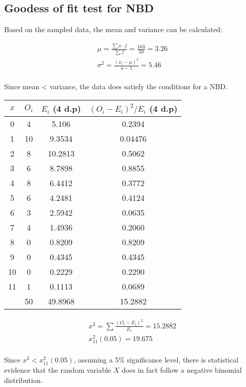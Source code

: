 \documentclass{article}
\begin{document}
\subsection{Goodess of fit test for NBD}

Based on the sampled data, the mean and variance can be calculated:

\begin{gather*}
  \mu = \frac{\sum x \cdot f}{\sum f} = \frac{163}{50} = 3.26 \\[5pt]
  \sigma^2 = \frac{(x_i - \mu)^2}{n - 1} = 5.46 \\[5pt]
\end{gather*}

Since mean < variance, the data does satisfy the conditions for
a NBD.

\begin{center}
  \begin{tabular}{|c|c|c|c|}
    \hline
    $x$ & $O_i$ & $ E_i $ (4 d.p) & $ (O_i - E_i)^2 / E_i $ (4 d.p) \\
    \hline 
    \hline 
    0  & 4  & 5.106   & 0.2394 \\
    1  & 10 & 9.3534  & 0.04476 \\
    2  & 8  & 10.2813 & 0.5062 \\
    3  & 6  & 8.7898  & 0.8855 \\
    4  & 8  & 6.4412  & 0.3772 \\
    5  & 6  & 4.2481  & 0.4124 \\
    6  & 3  & 2.5942  & 0.0635 \\
    7  & 4  & 1.4936  & 0.2060 \\
    8  & 0  & 0.8209  & 0.8209 \\
    9  & 0  & 0.4345  & 0.4345 \\
    10 & 0  & 0.2229  & 0.2290 \\
    11 & 1  & 0.1113  & 0.0689 \\
    \hline
    \hline
       & 50 & 49.8968 & 15.2882  \\
    \hline
  \end{tabular}
\end{center}

\begin{gather*}
  x^2 = \sum \frac{(O_i - E_i)^2}{E_i} = 15.2882 \\[5pt]
  x^2_{11} (0.05) = 19.675 \\[5pt]
\end{gather*}

Since $ x^2 < x^2_{11}(0.05) $, assuming a 5\% significance level,
there is statistical evidence that
the random variable $ X $ does in fact follow a negative binomial
distribution.
\end{document}
